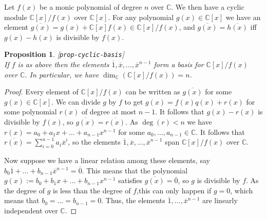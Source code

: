 \documentclass{amsart}
\newcommand{\lbl}[1]{\label{#1}\textup{[\texttt{#1}]}\ \\}
\newcommand{\lbl}{\label}
\newcommand{\C}         {{\mathbb{C}}}
\newcommand{\ov}[1]     {\overline{#1}}
\renewcommand{\:}{\colon}
\newtheorem{proposition}[theorem]{Proposition}
\theoremstyle{definition}
\begin{document}
Let $f(x)$ be a monic polynomial of degree $n$ over $\C$.  We then
have a cyclic module $\C[x]/f(x)$ over $\C[x]$.  For any polynomial
$g(x)\in\C[x]$ we have an element
$\ov{g(x)}=g(x)+\C[x]f(x)\in\C[x]/f(x)$, and $\ov{g(x)}=\ov{h(x)}$ iff
$g(x)-h(x)$ is divisible by $f(x)$.  
\begin{proposition}\lbl{prop-cyclic-basis}
 If $f$ is as above then the elements
 $\ov{1},\ov{x},\ldots,\ov{x}^{n-1}$ form a basis for $\C[x]/f(x)$
 over $\C$.  In particular, we have $\dim_\C(\C[x]/f(x))=n$.
\end{proposition}
\begin{proof}
 Every element of $\C[x]/f(x)$ can be written as $\ov{g(x)}$ for some
 $g(x)\in\C[x]$.  We can divide $g$ by $f$ to get $g(x)=f(x)q(x)+r(x)$
 for some polynomial $r(x)$ of degree at most $n-1$.  It follows that
 $g(x)-r(x)$ is divisible by $f(x)$, so $\ov{g(x)}=\ov{r(x)}$.  As
 $\deg(r)<n$ we have $r(x)=a_0+a_1x+\ldots+a_{n-1}x^{n-1}$ for some
 $a_0,\ldots,a_{n-1}\in\C$.  It follows that
 $\ov{r(x)}=\sum_{i=0}^{n-1}a_i\ov{x}^i$, so the elements
 $\ov{1},\ov{x},\ldots,\ov{x}^{n-1}$ span $\C[x]/f(x)$ over $\C$.

 Now suppose we have a linear relation among these elements, say
 $b_0\ov{1}+\ldots+b_{n-1}\ov{x}^{n-1}=\ov{0}$.  This means that the
 polynomial $g(x):=b_0+b_1x+\ldots+b_{n-1}x^{n-1}$ satisfies
 $\ov{g(x)}=\ov{0}$, so $g$ is divisible by $f$.  As the degree of $g$
 is less than the degree of $f$,this can only happen if $g=0$, which
 means that $b_0=\ldots=b_{n-1}=0$.  Thus, the elements
 $\ov{1},\ldots,\ov{x}^{n-1}$ are linearly independent over $\C$.
\end{proof}
\end{document}
